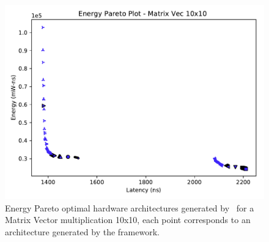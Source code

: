 \begin{figure}[tb] 
\centering
\includegraphics[width=\columnwidth]{graphs/EnergyParetoMatrixVec10.pdf}
    \caption{\small Energy Pareto optimal hardware architectures generated by \frameworkname~for a Matrix Vector multiplication 10x10, each point corresponds to an architecture generated by the framework.}
\label{fig:sram_vs_mram_pareto_vec}
\end{figure}

